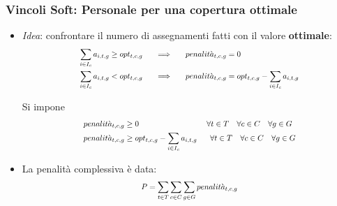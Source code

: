 \documentclass[xcolor={dvipsnames, table}]{beamer}
\newcommand\scalemath[2]{\scalebox{#1}{\mbox{\ensuremath{\displaystyle #2}}}}
\begin{document}
\begin{frame}
	\frametitle{Vincoli Soft: Personale per una copertura ottimale}
			\begin{itemize}
				\item \textit{Idea}: confrontare il numero di assegnamenti fatti con il valore \textbf{ottimale}:
				\begin{equation*}
				\scalemath{0.8}{
				\begin{aligned}
				\sum_{i \in I_c} a_{i, t, g} \geq opt_{t,c,g}~~~~~ &\Longrightarrow~~~~~ penalit\grave{a}_{t, c, g} = 0 \\
				\sum_{i \in I_c} a_{i, t, g} < opt_{t,c,g}~~~~~&\Longrightarrow~~~~~penalit\grave{a}_{t, c, g} = 									opt_{t,c,g} - \sum_{i \in I_c} a_{i, t, g} \\
				\end{aligned}
				}
				\end{equation*}
				\begin{block}{Si impone}
				\begin{equation*}
				\scalemath{0.8}{
				\begin{aligned}
				penalit\grave{a}_{t, c, g} &\geq 0 ~~~~~~~~~~~~~~~~~~~~~~~~~~\forall t \in T ~~~ \forall c \in C ~~~ \forall g \in G \\
				penalit\grave{a}_{t, c, g} &\geq opt_{t,c,g} - \sum_{i \in I_c} a_{i, t, g} ~~~~~ \forall t \in T ~~~ 						\forall c \in C ~~~ \forall g \in G \\
				\end{aligned}
				}
				\end{equation*}
				\end{block}
				\item La penalità complessiva è data:
				\begin{equation*}
				\scalemath{0.8}{
				\begin{aligned}
				P &=  \sum_{t \in T} \sum_{c \in C} \sum_{g \in G} penalit\grave{a}_{t, c, g} \\
				\end{aligned}
				}
				\end{equation*}
			\end{itemize}
\end{frame}
\end{document}
